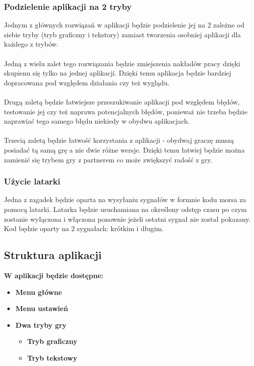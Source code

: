\subsubsection{Podzielenie aplikacji na 2 tryby}
Jednym z głównych rozwiązań w aplikacji będzie podzielenie jej na 2 zależne od siebie tryby (tryb graficzny i tekstory) zamiast tworzenia osobniej aplikacji dla każdego z trybów.
\\
\\
Jedną z wielu zalet tego rozwiązania będzie zmiejszenia nakładów pracy dzięki skupienu się tylko na jednej aplikacji. Dzięki temu aplikacja będzie bardziej dopracowana pod względem działania czy też wyglądu.
\\
\\
Drugą zaletą będzie łatwiejsze przeszukiwanie aplikacji pod względem błędów, testowanie jej czy też naprawa potencjalnych błędów, ponieważ nie trzeba będzie naprawiać tego samego błędu niekiedy w obydwu aplikacjach.
\\
\\
Trzecią zaletą będzie łatwość korzystania z aplikacji - obydwaj graczę muszą posiadać tą samą grę a nie dwie różne wersje. Dzięki temu łatwiej będzie można zamienić się trybem gry z partnerem co może zwiększyć radość z gry.


\subsubsection{Użycie latarki}
Jedna z zagadek będzie oparta na wysyłaniu sygnałów w formnie kodu morsa za pomocą latarki. Latarka będzie uruchamiana na określony odstęp czasu po czym zostanie wyłączona i włączona ponownie jeżeli ostatni sygnał nie został pokazany. Kod będzie oparty na 2 sygnałach: krótkim i długim.

\subsection{Struktura aplikacji}

\textbf{W aplikacji będzie dostępne: }
\begin{itemize}
	\item \textbf{Menu główne}
	\item \textbf{Menu ustawień} 
	\item   \textbf{Dwa tryby gry}
\begin{itemize}
	\item \textbf{Tryb graficzny}
	\item \textbf{Tryb tekstowy} 
\end{itemize}
\end{itemize}

